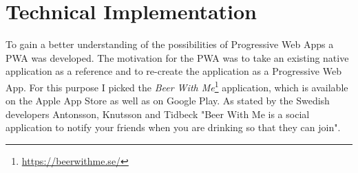 \section{Technical Implementation}
To gain a better understanding of the possibilities of Progressive Web Apps a PWA was developed. The motivation for the PWA was to take an existing native application as a reference and to re-create the application as a Progressive Web App. For this purpose I picked the \textit{Beer With Me}\footnote{\url{https://beerwithme.se/}} application, which is available on the Apple App Store as well as on Google Play. As stated by the Swedish developers Antonsson, Knutsson and Tidbeck "Beer With Me is a social application to notify your friends when you are drinking so that they can join".

